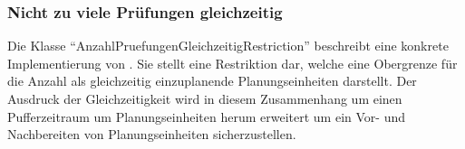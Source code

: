 \subsubsection{Nicht zu viele Prüfungen gleichzeitig}\label{subsubsec:nicht-zu-viele-pruefungen-gleichzeitig}
Die Klasse \enquote{AnzahlPruefungenGleichzeitigRestriction} beschreibt eine konkrete Implementierung von
\hyperref[subsubsec:anzahl-gleichzeitig-zu-hoch]{}.
Sie stellt eine Restriktion dar, welche eine Obergrenze für die Anzahl als gleichzeitig einzuplanende
Planungseinheiten darstellt.
Der Ausdruck der Gleichzeitigkeit wird in diesem Zusammenhang um einen Pufferzeitraum
um Planungseinheiten herum erweitert um ein Vor- und Nachbereiten von Planungseinheiten sicherzustellen.
